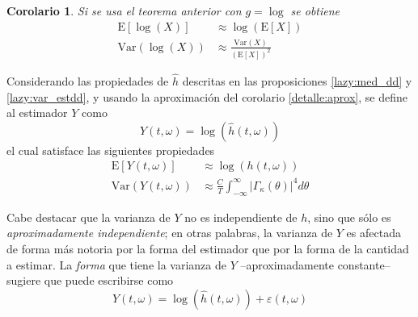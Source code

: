 \documentclass[12pt,letterpaper]{book}
\newtheorem{corolario}[teorema]{Corolario}
\newcommand{\intR}{\int_{-\infty}^{\infty}}
\newcommand{\E}[1]{\mathrm{E}\left[ #1 \right]}
\newcommand{\Var}[1]{\mathrm{Var}\left( #1 \right)}
\newcommand{\abso}[1]{\left| #1 \right|}
\begin{document}
\begin{corolario}
Si se usa el teorema anterior con $g = \log$ se obtiene
\begin{align}
\E{\log(X)} &\approx \log\left( \E{X} \right) \\
\Var{\log(X)} &\approx \frac{\Var{X}}{\left( \E{X} \right)^{2}}
\end{align}
\end{corolario}

Considerando las propiedades de $\widehat{h}$ descritas en las proposiciones \ref{lazy:med_dd} y \ref{lazy:var_estdd}, y usando la aproximación del corolario \ref{detalle:aprox}, se define al estimador $Y$ como
\begin{equation}
Y(t,\omega) = \log\left(\widehat{h}(t,\omega)\right)
\end{equation}
el cual satisface las siguientes propiedades
\begin{align}
\E{Y(t,\omega)} &\approx \log\left(h(t,\omega)\right) \\
\Var{Y(t,\omega)} &\approx \frac{C}{T} \intR \abso{\Gamma_\kappa(\theta)}^{4} d\theta
\end{align}

Cabe destacar que la varianza de $Y$ no es independiente de $h$, sino que sólo es \textit{aproximadamente independiente}; en otras palabras, la varianza de $Y$ es afectada de forma más notoria por la forma del estimador que por la forma de la cantidad a estimar.
%
La \textit{forma} que tiene la varianza de $Y$ --aproximadamente constante-- sugiere que puede escribirse como
\begin{equation}
Y(t,\omega) = \log\left(\widehat{h}(t,\omega) \right) + \varepsilon(t,\omega)
\label{ye}
\end{equation}
\end{document}
